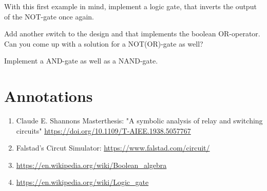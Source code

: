 \documentclass{dcbl/challenge}
\begin{document}
\begin{aufgabe}
\begin{minipage}{.5\textwidth}
    \label{fig:not2}
    \end{minipage}
\end{aufgabe}

\begin{aufgabe}
    With this first example in mind, implement a logic gate, that inverts the output of the NOT-gate once again.
\end{aufgabe}

\begin{aufgabe}
    Add another switch to the design and that implements the boolean OR-operator.
    Can you come up with a solution for a NOT(OR)-gate as well? 
\end{aufgabe}

\begin{aufgabe}
    Implement a AND-gate as well as a NAND-gate.
\end{aufgabe}

\section*{Annotations}
\begin{enumerate}
    \item Claude E. Shannons Masterthesis: "A symbolic analysis of relay and switching circuits" \url{https://doi.org/10.1109/T-AIEE.1938.5057767}
    \item Falstad's Circut Simulator: \url{https://www.falstad.com/circuit/}
    \item \url{https://en.wikipedia.org/wiki/Boolean_algebra}
    \item \url{https://en.wikipedia.org/wiki/Logic_gate}
\end{enumerate}
\end{document}

